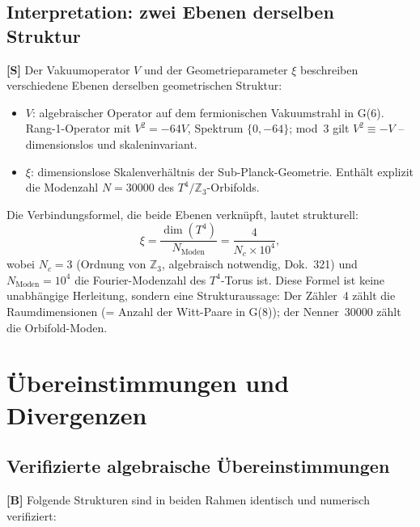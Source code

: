 \subsection{Interpretation: zwei Ebenen derselben Struktur}

\textbf{[S]} Der Vakuumoperator $V$ und der Geometrieparameter $\xi$
beschreiben verschiedene Ebenen derselben geometrischen Struktur:

\begin{itemize}
  \item $V$: algebraischer Operator auf dem fermionischen Vakuumstrahl
    in G(6). Rang-1-Operator mit $V^2 = -64V$, Spektrum $\{0, -64\}$; mod~3 gilt $V^2 \equiv -V$ -- dimensionslos und skaleninvariant.
  \item $\xi$: dimensionslose Skalenverhältnis der Sub-Planck-Geometrie.
    Enthält explizit die Modenzahl $N = 30000$ des $T^4/\mathbb{Z}_3$-Orbifolds.
\end{itemize}

Die Verbindungsformel, die beide Ebenen verknüpft, lautet strukturell:
\begin{equation}
  \xi = \frac{\dim(T^4)}{N_{\text{Moden}}} = \frac{4}{N_c \times 10^4},
  \label{eq:xi_struct}
\end{equation}
wobei $N_c = 3$ (Ordnung von $\mathbb{Z}_3$, algebraisch notwendig, Dok.~321)
und $N_{\text{Moden}} = 10^4$ die Fourier-Modenzahl des $T^4$-Torus ist.
Diese Formel ist keine unabhängige Herleitung, sondern eine Strukturaussage:
Der Zähler~4 zählt die Raumdimensionen (= Anzahl der Witt-Paare in G(8));
der Nenner~30000 zählt die Orbifold-Moden.

\section{Übereinstimmungen und Divergenzen}

\subsection{Verifizierte algebraische Übereinstimmungen}

\textbf{[B]} Folgende Strukturen sind in beiden Rahmen identisch und
numerisch verifiziert:

